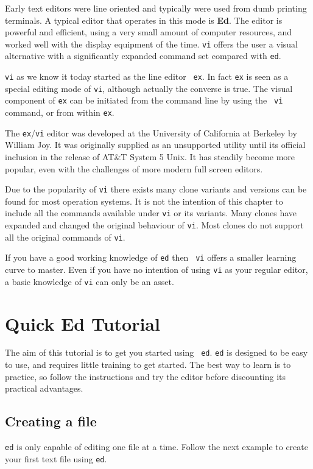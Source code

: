 Early text editors were line oriented and typically were used from
dumb printing terminals. A typical editor that operates in this mode
is {\bf Ed}. The editor is powerful and efficient, using a
very small amount of computer resources, and worked well with the
display equipment of the time.  {\tt vi} offers the user a visual
alternative with a significantly expanded command set compared with
{\tt ed}.

{\tt vi} as we know it today started as the line editor {\tt
  ex}.  In fact {\tt ex} is seen as a special editing mode of
{\tt vi}, although actually the converse is true. The visual component
of {\tt ex} can be initiated from the command line by using the {\tt
  vi} command, or from within {\tt ex}.

The {\tt ex}/{\tt vi} editor was developed at the University of
California at Berkeley by
William Joy. It was originally supplied as an
unsupported utility until its official inclusion in the release of
AT\&T System 5 Unix.  It has steadily become more popular, even with
the challenges of more modern full screen editors.

Due to the popularity of {\tt vi} there exists many clone variants and
versions can be found for most operation systems. It is not the
intention of this chapter to include all the commands available under
{\tt vi} or its variants. Many clones have expanded and changed the
original behaviour of {\tt vi}. Most clones do not support all the
original commands of {\tt vi}. 

If you have a good working knowledge of {\tt ed} then {\tt
  vi} offers a smaller learning curve to master. Even if you have no
intention of using {\tt vi} as your regular editor, a basic knowledge
of {\tt vi} can only be an asset.

\section{Quick Ed Tutorial}

The aim of this tutorial is to get you started using {\tt
  ed}. {\tt ed} is designed to be easy to use, and requires
little training to get started. The best way to learn is to practice,
so follow the instructions and try the editor before discounting its
practical advantages.

\subsection{Creating a file}
{\tt ed} is only capable of editing one file at a time. Follow the next
example to create your first text file using {\tt ed}.

